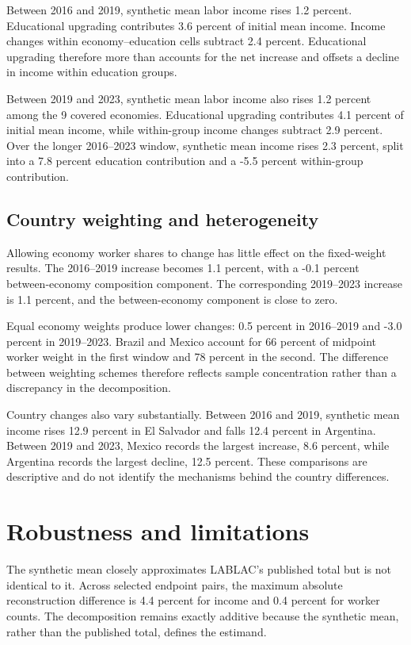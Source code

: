 \documentclass[11pt]{article}
\begin{document}


Between 2016 and 2019, synthetic mean labor income rises 1.2 percent.
Educational upgrading contributes 3.6 percent of initial mean income. Income
changes within economy--education cells subtract 2.4 percent. Educational
upgrading therefore more than accounts for the net increase and offsets a
decline in income within education groups.

Between 2019 and 2023, synthetic mean labor income also rises 1.2 percent
among the 9 covered economies. Educational upgrading contributes 4.1 percent
of initial mean income, while within-group income changes subtract 2.9
percent. Over the longer 2016--2023 window, synthetic mean income rises 2.3
percent, split into a 7.8 percent education contribution and a -5.5 percent
within-group contribution.

\subsection{Country weighting and heterogeneity}

Allowing economy worker shares to change has little effect on the fixed-weight
results. The 2016--2019 increase becomes 1.1 percent, with a -0.1 percent
between-economy composition component. The corresponding 2019--2023 increase
is 1.1 percent, and the between-economy component is close to zero.

Equal economy weights produce lower changes: 0.5 percent in 2016--2019 and
-3.0 percent in 2019--2023. Brazil and Mexico account for 66 percent of
midpoint worker weight in the first window and 78 percent in the second.
The difference between weighting schemes therefore reflects sample
concentration rather than a discrepancy in the decomposition.

Country changes also vary substantially. Between 2016 and 2019, synthetic
mean income rises 12.9 percent in El Salvador and falls 12.4 percent in
Argentina. Between 2019 and 2023, Mexico records the largest increase, 8.6
percent, while Argentina records the largest decline, 12.5 percent. These
comparisons are descriptive and do not identify the mechanisms behind the
country differences.

\section{Robustness and limitations}

The synthetic mean closely approximates LABLAC's published total but is not
identical to it. Across selected endpoint pairs, the maximum absolute
reconstruction difference is 4.4 percent for income and 0.4 percent for
worker counts. The decomposition remains exactly additive because the
synthetic mean, rather than the published total, defines the estimand.
\end{document}
